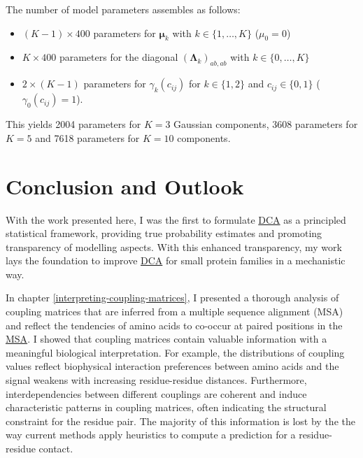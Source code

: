 \documentclass[11pt,a4paper,twoside]{book}
\providecommand{\tightlist}{%
  \setlength{\itemsep}{0pt}\setlength{\parskip}{0pt}}
\newcommand{\eq}{\!=\!}
\newcommand{\Lk}{\mathbf{\Lambda}_k}
\newcommand{\muk}{\mathbf{\mu}_k}
\newcommand{\cij}{c_{ij}}
\theoremstyle{definition}
\theoremstyle{definition}
\theoremstyle{remark}
\begin{document}
The number of model parameters assembles as follows:

\begin{itemize}
\tightlist
\item
  \((K-1) \times 400\) parameters for \(\muk\) with
  \(k \in \{1, \ldots, K \}\) (\(\mu_0 = 0\))
\item
  \(K \times 400\) parameters for the diagonal \((\Lk)_{ab, ab}\) with
  \(k \in \{0, \ldots, K\}\)
\item
  \(2 \times (K\!-\!1)\) parameters for \(\gamma_k(\cij)\) for
  \(k \in \{1,2\}\) and \(\cij \in \{0,1\}\) (\(\gamma_0(\cij)\eq1\)).
\end{itemize}

This yields 2004 parameters for \(K\eq3\) Gaussian components, 3608
parameters for \(K\eq5\) and 7618 parameters for \(K\eq10\) components.

\chapter{Conclusion and Outlook}\label{conclusion-and-outlook}

With the work presented here, I was the first to formulate
\protect\hyperlink{abbrev}{DCA} as a principled statistical framework,
providing true probability estimates and promoting transparency of
modelling aspects. With this enhanced transparency, my work lays the
foundation to improve \protect\hyperlink{abbrev}{DCA} for small protein
families in a mechanistic way.

In chapter \ref{interpreting-coupling-matrices}, I presented a thorough
analysis of coupling matrices that are inferred from a multiple sequence
alignment (MSA) and reflect the tendencies of amino acids to co-occur at
paired positions in the \protect\hyperlink{abbrev}{MSA}. I showed that
coupling matrices contain valuable information with a meaningful
biological interpretation. For example, the distributions of coupling
values reflect biophysical interaction preferences between amino acids
and the signal weakens with increasing residue-residue distances.
Furthermore, interdependencies between different couplings are coherent
and induce characteristic patterns in coupling matrices, often
indicating the structural constraint for the residue pair. The majority
of this information is lost by the the way current methods apply
heuristics to compute a prediction for a residue-residue contact.
\end{document}
